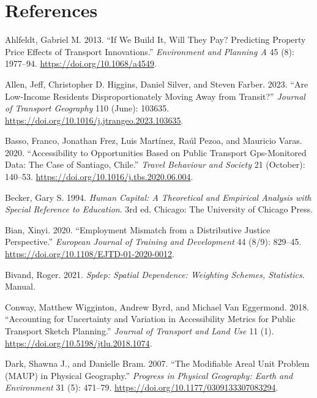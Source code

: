 \documentclass{article}
\newlength{\cslhangindent}
\newenvironment{CSLReferences}[2] %
 {\begin{list}{}{%
  \setlength{\itemindent}{0pt}
  \setlength{\leftmargin}{0pt}
  \setlength{\parsep}{0pt}
  \ifodd #1
   \setlength{\leftmargin}{\cslhangindent}
   \setlength{\itemindent}{-1\cslhangindent}
  \fi
  \setlength{\itemsep}{#2\baselineskip}}}
 {\end{list}}
\begin{document}
\FloatBarrier

\section*{References}\label{references}

\label{refs}
\begin{CSLReferences}{1}{0}
Ahlfeldt, Gabriel M. 2013. {``If We Build It, Will They Pay? Predicting
Property Price Effects of Transport Innovations.''} \emph{Environment
and Planning A} 45 (8): 1977--94. \url{https://doi.org/10.1068/a4549}.

Allen, Jeff, Christopher D. Higgins, Daniel Silver, and Steven Farber.
2023. {``Are Low-Income Residents Disproportionately Moving Away from
Transit?''} \emph{Journal of Transport Geography} 110 (June): 103635.
\url{https://doi.org/10.1016/j.jtrangeo.2023.103635}.

Basso, Franco, Jonathan Frez, Luis Martínez, Raúl Pezoa, and Mauricio
Varas. 2020. {``Accessibility to Opportunities Based on Public Transport
Gps-Monitored Data: {The} Case of {Santiago}, {Chile}.''} \emph{Travel
Behaviour and Society} 21 (October): 140--53.
\url{https://doi.org/10.1016/j.tbs.2020.06.004}.

Becker, Gary S. 1994. \emph{Human {Capital}: {A Theoretical} and
{Empirical Analysis} with {Special Reference} to {Education}}. 3rd ed.
Chicago: The University of Chicago Press.

Bian, Xinyi. 2020. {``Employment Mismatch from a Distributive Justice
Perspective.''} \emph{European Journal of Training and Development} 44
(8/9): 829--45. \url{https://doi.org/10.1108/EJTD-01-2020-0012}.

Bivand, Roger. 2021. \emph{Spdep: {Spatial} Dependence: {Weighting}
Schemes, Statistics}. Manual.

Conway, Matthew Wigginton, Andrew Byrd, and Michael Van Eggermond. 2018.
{``Accounting for Uncertainty and Variation in Accessibility Metrics for
Public Transport Sketch Planning.''} \emph{Journal of Transport and Land
Use} 11 (1). \url{https://doi.org/10.5198/jtlu.2018.1074}.

Dark, Shawna J., and Danielle Bram. 2007. {``The Modifiable Areal Unit
Problem ({MAUP}) in Physical Geography.''} \emph{Progress in Physical
Geography: Earth and Environment} 31 (5): 471--79.
\url{https://doi.org/10.1177/0309133307083294}.


\end{CSLReferences}
\end{document}
